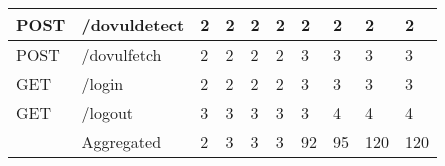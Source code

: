 \begin{table*}[]
\begin{tabular}{|p{}|p{}|p{}|p{}|p{}|p{}|p{}|p{}|p{}|p{}|}
  POST                                  & /dovuldetect                       & 2                                          & 2                                          & 2                                          & 2                                          & 2                                          & 2                                          & 2                                          & 2                                           \\ \hline
  POST                                  & /dovulfetch                        & 2                                          & 2                                          & 2                                          & 2                                          & 3                                          & 3                                          & 3                                          & 3                                           \\ \hline
  GET                                   & /login                             & 2                                          & 2                                          & 2                                          & 2                                          & 3                                          & 3                                          & 3                                          & 3                                           \\ \hline
  GET                                   & /logout                            & 3                                          & 3                                          & 3                                          & 3                                          & 3                                          & 4                                          & 4                                          & 4                                           \\ \hline
                                        & Aggregated                         & 2                                          & 3                                          & 3                                          & 3                                          & 92                                         & 95                                         & 120                                        & 120                                         \\ \hline
  \end{tabular}
  \end{table*}
